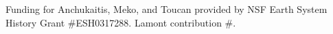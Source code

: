 \documentclass[draft,jgr]{AGUTeX}
\begin{document}
\begin{article}







%
%
%


\begin{acknowledgments}
Funding for Anchukaitis, Meko, and Toucan provided by NSF Earth System History Grant \#ESH0317288. Lamont contribution \#.
\end{acknowledgments}


\end{article}
\end{document}
